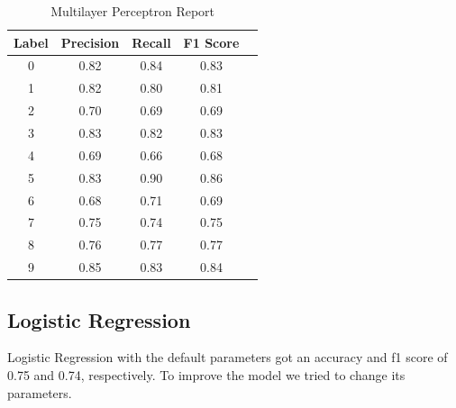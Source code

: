 \documentclass[conference]{IEEEtran}
\begin{document}
\begin{table}[!h]
    \centering
    \begin{tabular}{|c|c|c|c|r|}
        \hline
        \textbf{Label} & \textbf{Precision} & \textbf{Recall} & \textbf{F1 Score} \\ \hline
        0              & 0.82               & 0.84            & 0.83              \\ \hline
        1              & 0.82               & 0.80            & 0.81              \\ \hline
        2              & 0.70               & 0.69            & 0.69              \\ \hline
        3              & 0.83               & 0.82            & 0.83              \\ \hline
        4              & 0.69               & 0.66            & 0.68              \\ \hline
        5              & 0.83               & 0.90            & 0.86              \\ \hline
        6              & 0.68               & 0.71            & 0.69              \\ \hline
        7              & 0.75               & 0.74            & 0.75              \\ \hline
        8              & 0.76               & 0.77            & 0.77              \\ \hline
        9              & 0.85               & 0.83            & 0.84              \\ \hline
    \end{tabular}
    
    \caption{Multilayer Perceptron Report \label{tab:mlp_classification_report}}
\end{table}

\subsection{Logistic Regression}
Logistic Regression with the default parameters got an accuracy and f1 score of 0.75 and 0.74, respectively.
To improve the model we tried to change its parameters.
\end{document}
